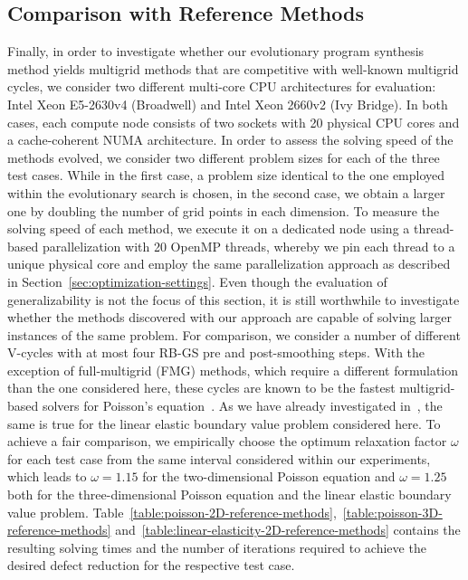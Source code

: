 \subsection{Comparison with Reference Methods}
Finally, in order to investigate whether our evolutionary program synthesis method yields multigrid methods that are competitive with well-known multigrid cycles, we consider two different multi-core CPU architectures for evaluation: Intel Xeon E5-2630v4 (Broadwell) and Intel Xeon 2660v2 (Ivy Bridge).
In both cases, each compute node consists of two sockets with 20 physical CPU cores and a cache-coherent NUMA architecture.
In order to assess the solving speed of the methods evolved, we consider two different problem sizes for each of the three test cases.
While in the first case, a problem size identical to the one employed within the evolutionary search is chosen, in the second case, we obtain a larger one by doubling the number of grid points in each dimension.
To measure the solving speed of each method, we execute it on a dedicated node using a thread-based parallelization with 20 OpenMP threads, whereby we pin each thread to a unique physical core and employ the same parallelization approach as described in Section~\ref{sec:optimization-settings}.
Even though the evaluation of generalizability is not the focus of this section, it is still worthwhile to investigate whether the methods discovered with our approach are capable of solving larger instances of the same problem.
For comparison, we consider a number of different V-cycles with at most four RB-GS pre and post-smoothing steps.
With the exception of full-multigrid (FMG) methods, which require a different formulation than the one considered here, these cycles are known to be the fastest multigrid-based solvers for Poisson's equation~\cite{trottenberg2000multigrid}.
As we have already investigated in~\cite{schmitt2020constructing}, the same is true for the linear elastic boundary value problem considered here.
To achieve a fair comparison, we empirically choose the optimum relaxation factor $\omega$ for each test case from the same interval considered within our experiments, which leads to $\omega = 1.15$ for the two-dimensional Poisson equation and $\omega = 1.25$ both for the three-dimensional Poisson equation and the linear elastic boundary value problem.
Table~\ref{table:poisson-2D-reference-methods},~\ref{table:poisson-3D-reference-methods} and~\ref{table:linear-elasticity-2D-reference-methods} contains the resulting solving times and the number of iterations required to achieve the desired defect reduction for the respective test case.
